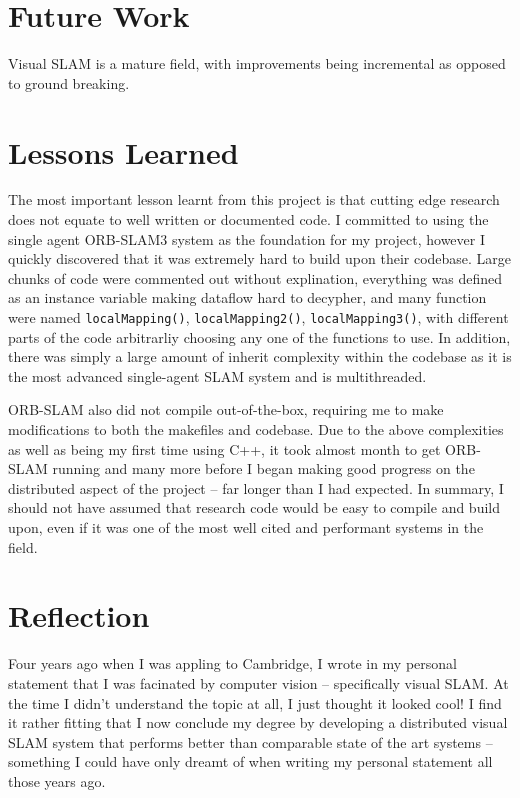 

\label{sec:5}

\section{Future Work}
\label{sec:future-work}
Visual SLAM is a mature field, with improvements being incremental as opposed to ground breaking.

\section{Lessons Learned}
\label{sec:lessons-learned}
The most important lesson learnt from this project is that cutting edge research does not equate to well written or documented code. I committed to using the single agent ORB-SLAM3 system as the foundation for my project, however I quickly discovered that it was extremely hard to build upon their codebase. Large chunks of code were commented out without explination, everything was defined as an instance variable making dataflow hard to decypher, and many function were named \texttt{localMapping()}, \texttt{localMapping2()}, \texttt{localMapping3()}, with different parts of the code arbitrarliy choosing any one of the functions to use. In addition, there was simply a large amount of inherit complexity within the codebase as it is the most advanced single-agent SLAM system and is multithreaded.

ORB-SLAM also did not compile out-of-the-box, requiring me to make modifications to both the makefiles and codebase. Due to the above complexities as well as being my first time using C++, it took almost month to get ORB-SLAM running and many more before I began making good progress on the distributed aspect of the project – far longer than I had expected. In summary, I should not have assumed that research code would be easy to compile and build upon, even if it was one of the most well cited and performant systems in the field.

\section{Reflection}
\label{sec:reflection}

Four years ago when I was appling to Cambridge, I wrote in my personal statement that I was facinated by computer vision – specifically visual SLAM. At the time I didn't understand the topic at all, I just thought it looked cool! I find it rather fitting that I now conclude my degree by developing a distributed visual SLAM system that performs better than comparable state of the art systems – something I could have only dreamt of when writing my personal statement all those years ago.

